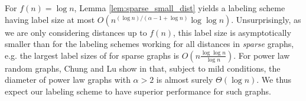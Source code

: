 For $f(n) = \log n$, Lemma \ref{lem:sparse_small_dist} yields a labeling scheme having label size
at most $O\left(n^{(\log n)/(\alpha - 1 + \log n)} \log\log n \right)$. Unsurprisingly, as we are only considering distances up
to $f(n)$, this label size is asymptotically smaller than for the labeling
schemes working for all distances in \emph{sparse} graphs, e.g. the largest label sizes of \cite{DBLP:journals/corr/GawrychowskiKU15} for sparse graphs is $O(n \frac{\log \log n}{ \log n})$.
For power law random graphs, Chung and Lu show in \cite{chung2004average} that, subject to mild conditions, the diameter of power law graphs with $\alpha > 2$ is almost surely $\Theta(\log n)$. We thus expect our labeling scheme to have
superior performance for such graphs.
